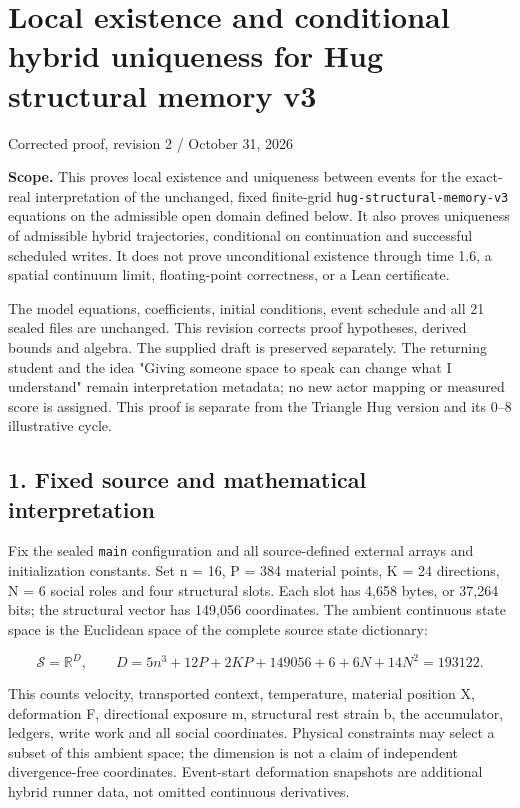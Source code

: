 \documentclass[11pt,a4paper]{article}
\begin{document}
\section*{Local existence and conditional hybrid uniqueness for Hug structural memory v3}

Corrected proof, revision 2  /  October 31, 2026

\textbf{Scope.} This proves local existence and uniqueness between events for the exact-real interpretation of the unchanged, fixed finite-grid \texttt{hug-structural-memory-v3} equations on the admissible open domain defined below. It also proves uniqueness of admissible hybrid trajectories, conditional on continuation and successful scheduled writes. It does not prove unconditional existence through time 1.6, a spatial continuum limit, floating-point correctness, or a Lean certificate.

The model equations, coefficients, initial conditions, event schedule and all 21 sealed files are unchanged. This revision corrects proof hypotheses, derived bounds and algebra. The supplied draft is preserved separately. The returning student and the idea "Giving someone space to speak can change what I understand" remain interpretation metadata; no new actor mapping or measured score is assigned. This proof is separate from the Triangle Hug version and its 0--8 illustrative cycle.

\subsection*{1. Fixed source and mathematical interpretation}

Fix the sealed \texttt{main} configuration and all source-defined external arrays and initialization constants. Set n = 16, P = 384 material points, K = 24 directions, N = 6 social roles and four structural slots. Each slot has 4,658 bytes, or 37,264 bits; the structural vector has 149,056 coordinates. The ambient continuous state space is the Euclidean space of the complete source state dictionary:



\[
\mathcal S=\mathbb R^D,\qquad
D=5n^3+12P+2KP+149056+6+6N+14N^2=193122.
\]



This counts velocity, transported context, temperature, material position X, deformation F, directional exposure m, structural rest strain b, the accumulator, ledgers, write work and all social coordinates. Physical constraints may select a subset of this ambient space; the dimension is not a claim of independent divergence-free coordinates. Event-start deformation snapshots are additional hybrid runner data, not omitted continuous derivatives.
\end{document}
